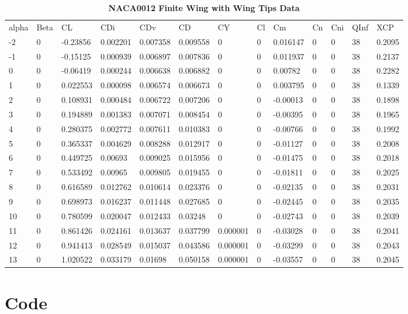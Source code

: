 \begin{singlespace}
\begin{table}
\caption{\textbf{NACA0012 Finite Wing with Wing Tips Data}} \label{table:NACA0012_finite_tips}
\begin{tabular}{|l|l|l|l|l|l|l|l|l|l|l|l|l|}
alpha & Beta & CL       & CDi      & CDv      & CD       & CY       & Cl & Cm       & Cn & Cni & QInf & XCP    \\
-2    & 0    & -0.23856 & 0.002201 & 0.007358 & 0.009558 & 0        & 0  & 0.016147 & 0  & 0   & 38   & 0.2095 \\
-1    & 0    & -0.15125 & 0.000939 & 0.006897 & 0.007836 & 0        & 0  & 0.011937 & 0  & 0   & 38   & 0.2137 \\
0     & 0    & -0.06419 & 0.000244 & 0.006638 & 0.006882 & 0        & 0  & 0.00782  & 0  & 0   & 38   & 0.2282 \\
1     & 0    & 0.022553 & 0.000098 & 0.006574 & 0.006673 & 0        & 0  & 0.003795 & 0  & 0   & 38   & 0.1339 \\
2     & 0    & 0.108931 & 0.000484 & 0.006722 & 0.007206 & 0        & 0  & -0.00013 & 0  & 0   & 38   & 0.1898 \\
3     & 0    & 0.194889 & 0.001383 & 0.007071 & 0.008454 & 0        & 0  & -0.00395 & 0  & 0   & 38   & 0.1965 \\
4     & 0    & 0.280375 & 0.002772 & 0.007611 & 0.010383 & 0        & 0  & -0.00766 & 0  & 0   & 38   & 0.1992 \\
5     & 0    & 0.365337 & 0.004629 & 0.008288 & 0.012917 & 0        & 0  & -0.01127 & 0  & 0   & 38   & 0.2008 \\
6     & 0    & 0.449725 & 0.00693  & 0.009025 & 0.015956 & 0        & 0  & -0.01475 & 0  & 0   & 38   & 0.2018 \\
7     & 0    & 0.533492 & 0.00965  & 0.009805 & 0.019455 & 0        & 0  & -0.01811 & 0  & 0   & 38   & 0.2025 \\
8     & 0    & 0.616589 & 0.012762 & 0.010614 & 0.023376 & 0        & 0  & -0.02135 & 0  & 0   & 38   & 0.2031 \\
9     & 0    & 0.698973 & 0.016237 & 0.011448 & 0.027685 & 0        & 0  & -0.02445 & 0  & 0   & 38   & 0.2035 \\
10    & 0    & 0.780599 & 0.020047 & 0.012433 & 0.03248  & 0        & 0  & -0.02743 & 0  & 0   & 38   & 0.2039 \\
11    & 0    & 0.861426 & 0.024161 & 0.013637 & 0.037799 & 0.000001 & 0  & -0.03028 & 0  & 0   & 38   & 0.2041 \\
12    & 0    & 0.941413 & 0.028549 & 0.015037 & 0.043586 & 0.000001 & 0  & -0.03299 & 0  & 0   & 38   & 0.2043 \\
13    & 0    & 1.020522 & 0.033179 & 0.01698  & 0.050158 & 0.000001 & 0  & -0.03557 & 0  & 0   & 38   & 0.2045        
\end{tabular}
\end{table}
\newpage
\section{\textbf{Code}}
    
\end{singlespace}
